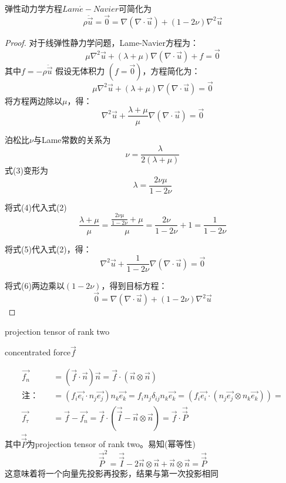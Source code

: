 \documentclass[12pt, a4paper, oneside, UTF8]{ctexbook}  %
\begin{document}
    \begin{proposition}
            弹性动力学方程$Lam\acute{e}-Navier$可简化为
            \[
            \rho\ddot{\vec{u}}=\vec{0}=\nabla\left(\nabla\cdot\vec{u}\right)+\left(1-2\nu\right)\nabla^2\vec{u}
            \]
    \end{proposition}
    \begin{proof}
对于线弹性静力学问题，Lame-Navier方程为：  
\[
\mu \nabla^2 \vec{u} + (\lambda + \mu) \nabla (\nabla \cdot \vec{u}) + f = \vec{0}
\]  
其中$f=-\rho\ddot{\vec{u}}$
假设无体积力 $(f = \vec{0})$，方程简化为：  
\[
\mu \nabla^2 \vec{u} + (\lambda + \mu) \nabla (\nabla \cdot \vec{u}) = \vec{0} \tag{1}
\]   
将方程两边除以\(\mu\)，得：  
\[
\nabla^2 \vec{u} + \frac{\lambda + \mu}{\mu} \nabla (\nabla \cdot \vec{u}) = \vec{0} \tag{2}
\]  

泊松比\(\nu\)与Lame常数的关系为 
\[
\nu = \frac{\lambda}{2(\lambda + \mu)} \tag{3}
\]  
式(3)变形为  
\[
\lambda = \frac{2\nu \mu}{1 - 2\nu} \tag{4}
\]  

将式(4)代入式(2)
\[
\frac{\lambda + \mu}{\mu} = \frac{\frac{2\nu \mu}{1 - 2\nu} + \mu}{\mu} = \frac{2\nu}{1 - 2\nu} + 1 = \frac{1}{1 - 2\nu} \tag{5}
\]  
  
将式(5)代入式(2)，得：  
\[
\nabla^2 \vec{u} + \frac{1}{1 - 2\nu} \nabla (\nabla \cdot \vec{u}) = \vec{0} \tag{6}
\]  
 
将式(6)两边乘以\((1 - 2\nu)\)，得到目标方程：  
\begin{equation*}
    \boxed{\vec{0} = \nabla (\nabla \cdot \vec{u}) + (1 - 2\nu) \nabla^2 \vec{u}} 
\end{equation*}
    \end{proof}
\begin{defn}
    projection tensor of rank two
    \begin{yzh}
        concentrated force$\vec{f}$
    \end{yzh}
    \begin{align*}
        \vec{f_n}&=\left(\vec{f}\cdot\vec{n}\right)\vec{n}=\vec{f}\cdot\left(\vec{n}\otimes\vec{n}\right)\\
        \text{注：}\quad&=\left(f_i\vec{e_i}\cdot n_j\vec{e_j}\right)n_k\vec{e_k}
        =f_in_j\delta_{ij}n_k\vec{e_k}=\left(f_i\vec{e_i}\cdot\left(n_j\vec{e_j}\otimes n_k\vec{e_k}\right)\right)=\\
        \vec{f_\tau}&=\vec{f}-\vec{f_n}=\vec{f}\cdot \left(\vec{\vec{I}}-\vec{n}\otimes\vec{n}\right)=\vec{f}\cdot\vec{\vec{P}}
    \end{align*}
    其中$\vec{\vec{P}}$为projection tensor of rank two。易知(幂等性)
    \[
    \vec{\vec{P}}^2=\vec{\vec{I}}-2\vec{n}\otimes\vec{n}+\vec{n}\otimes\vec{n}=\vec{\vec{P}}
    \]
    这意味着将一个向量先投影再投影，结果与第一次投影相同
\end{defn}
\end{document}
